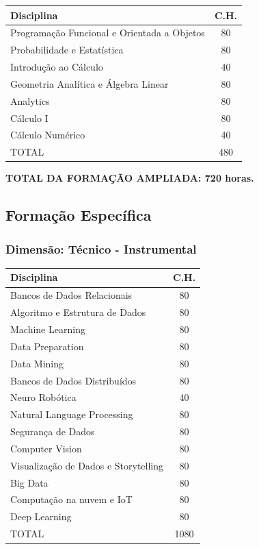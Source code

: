 \documentclass[a4paper, 12pt, openright, oneside, german, french, english, brazil]{abntex2}
\begin{document}
\begin{table}[!h]
  \footnotesize
  \centering
  \begin{tabular}{|p{9cm}|c|}
    \hline
    \textbf{Disciplina} & \textbf{C.H.} \\
    \hline
    Programação Funcional e Orientada a Objetos & 80 \\
    \hline
    Probabilidade e Estatística & 80 \\
    \hline
    Introdução ao Cálculo & 40 \\
    \hline
    Geometria Analítica e Álgebra Linear & 80 \\
    \hline
    Analytics & 80 \\
    \hline
    Cálculo I & 80 \\
    \hline
    Cálculo Numérico & 40 \\
    \hline
    TOTAL & 480 \\
    \hline
  \end{tabular}
\end{table}

\textbf{TOTAL DA FORMAÇÃO AMPLIADA: 720 horas.}

\subsection{Formação Específica}

\subsubsection{Dimensão: Técnico - Instrumental}

\begin{table}[!h]
  \footnotesize
  \centering
  \begin{tabular}{|p{8cm}|c|}
    \hline
    \textbf{Disciplina} & \textbf{C.H.} \\
    \hline
    Bancos de Dados Relacionais & 80 \\
    \hline
    Algoritmo e Estrutura de Dados & 80 \\
    \hline
    Machine Learning & 80 \\
    \hline
    Data Preparation & 80 \\
    \hline
    Data Mining & 80 \\
    \hline
    Bancos de Dados Distribuídos & 80 \\
    \hline
    Neuro Robótica & 40 \\
    \hline
    Natural Language Processing & 80 \\
    \hline
    Segurança de Dados & 80 \\
    \hline
    Computer Vision & 80 \\
    \hline
    Visualização de Dados e Storytelling & 80 \\
    \hline
    Big Data & 80 \\
    \hline
    Computação na nuvem e IoT & 80 \\
    \hline
    Deep Learning & 80 \\
    \hline
    TOTAL & 1080 \\
    \hline
  \end{tabular}
\end{table}
\end{document}
